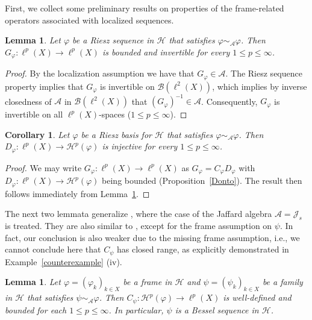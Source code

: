 \documentclass{amsart}
\newtheorem{lem.}[theorem]{Lemma}
\newtheorem{cor.}[theorem]{Corollary}
\def\Hil{\mathcal{H}}
\newcommand{\A}[0]{{\mathcal{A}}}
\renewcommand{\H}{{\mathcal{H}}}
\begin{document}
First, we collect some preliminary results on properties of the frame-related operators associated with localized sequences.

\begin{lem.}\label{lem:invertible}
Let $\varphi$ be a Riesz sequence in $\H$ that satisfies $\varphi\sim_\A \varphi$. Then $G_\varphi:\ell^{p}(X)\to\ell^p(X)$ is bounded and invertible for every $1\leq p\leq \infty$. 
\end{lem.}
\begin{proof}
By the localization assumption we have that $G_\varphi\in \A$. The Riesz sequence property implies that $G_\varphi$ is invertible on $\mathcal{B}(\ell^2(X))$, which implies by inverse closedness of $\A$ in $\mathcal{B}(\ell^2(X))$ that  $(G_\varphi)^{-1}\in \A$. Consequently, $G_\varphi$ is invertible on all $\ell^p(X)$-spaces ($1\leq p\leq \infty$). 
\end{proof}

\begin{cor.}\label{cor:D-phi-injective}
Let $\varphi$ be a Riesz basis for $\H$ that satisfies $\varphi\sim_\A \varphi$. Then $D_\varphi:\ell^p(X)\to \H^p(\varphi)$ is injective for every $1\leq p\leq \infty$.
\end{cor.}
\begin{proof}
We may write $G_\varphi:\ell^{p}(X)\to\ell^p(X)$ as $G_\varphi=C_\varphi D_\varphi$ with $D_\varphi:\ell^p(X)\to \H^p(\varphi)$ being bounded (Proposition~\ref{Donto}). The result then follows immediately from Lemma~\ref{lem:invertible}.
\end{proof}

The next two lemmata generalize \cite[Proposition~8]{groe04}, where the case of the Jaffard algebra $\A=\mathcal{J}_s$ is treated. They are also similar to \cite[Lemma~6 and  7]{xxlgro14}, except for the frame assumption on $\psi$. In fact, our conclusion is also weaker due to the missing frame assumption, i.e., we cannot conclude here that $C_\psi$ has closed range, as explicitly demonstrated in Example~\ref{counterexample} (iv). 

\begin{lem.}\label{lem:bessel}
Let $\varphi = (\varphi_k)_{k\in X}$ be a frame in $\Hil$ and $\psi = (\psi_k)_{k\in X}$ be a family in $\H$ that satisfies $\psi\sim_\A \varphi$. Then $C_\psi:\H^p(\varphi)\to \ell^p(X)$ is well-defined and bounded for each $1\leq p\leq \infty$. In particular, $\psi$ is a Bessel sequence in $\Hil$.
\end{lem.}
\end{document}
